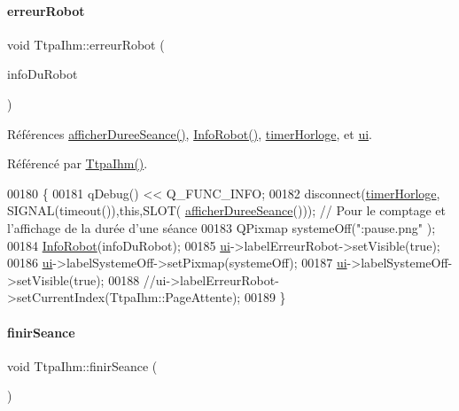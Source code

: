 \paragraph{\texorpdfstring{erreur\+Robot}{erreurRobot}}
{\footnotesize\ttfamily void Ttpa\+Ihm\+::erreur\+Robot (\begin{DoxyParamCaption}\item[{Q\+String}]{info\+Du\+Robot }\end{DoxyParamCaption})\hspace{0.3cm}{\ttfamily [slot]}}



Références \hyperlink{class_ttpa_ihm_a266897eb263e584b40fc2b7c26347623}{afficher\+Duree\+Seance()}, \hyperlink{class_ttpa_ihm_a1101f9766b4e90844576c1d6b7e2ea23}{Info\+Robot()}, \hyperlink{class_ttpa_ihm_a447ad7262efa01d22bc3222e0e470087}{timer\+Horloge}, et \hyperlink{class_ttpa_ihm_ad5fae1222a667da158c26f3d0f0dce23}{ui}.



Référencé par \hyperlink{class_ttpa_ihm_ab3ed4b37a93ff04842414d4a98861d66}{Ttpa\+Ihm()}.


\begin{DoxyCode}
00180 \{
00181     qDebug() << Q\_FUNC\_INFO;
00182     disconnect(\hyperlink{class_ttpa_ihm_a447ad7262efa01d22bc3222e0e470087}{timerHorloge}, SIGNAL(timeout()),\textcolor{keyword}{this},SLOT(
      \hyperlink{class_ttpa_ihm_a266897eb263e584b40fc2b7c26347623}{afficherDureeSeance}())); \textcolor{comment}{// Pour le comptage et l'affichage de la durée d'une séance}
00183     QPixmap systemeOff(\textcolor{stringliteral}{":pause.png"} );
00184     \hyperlink{class_ttpa_ihm_a1101f9766b4e90844576c1d6b7e2ea23}{InfoRobot}(infoDuRobot);
00185     \hyperlink{class_ttpa_ihm_ad5fae1222a667da158c26f3d0f0dce23}{ui}->labelErreurRobot->setVisible(\textcolor{keyword}{true});
00186     \hyperlink{class_ttpa_ihm_ad5fae1222a667da158c26f3d0f0dce23}{ui}->labelSystemeOff->setPixmap(systemeOff);
00187     \hyperlink{class_ttpa_ihm_ad5fae1222a667da158c26f3d0f0dce23}{ui}->labelSystemeOff->setVisible(\textcolor{keyword}{true});
00188     \textcolor{comment}{//ui->labelErreurRobot->setCurrentIndex(TtpaIhm::PageAttente);}
00189 \}
\end{DoxyCode}
\mbox{\label{class_ttpa_ihm_aec3a96864aaa87f245bdafbf7a076a94}} 
\paragraph{\texorpdfstring{finir\+Seance}{finirSeance}}
{\footnotesize\ttfamily void Ttpa\+Ihm\+::finir\+Seance (\begin{DoxyParamCaption}{ }\end{DoxyParamCaption})\hspace{0.3cm}{\ttfamily [slot]}}




